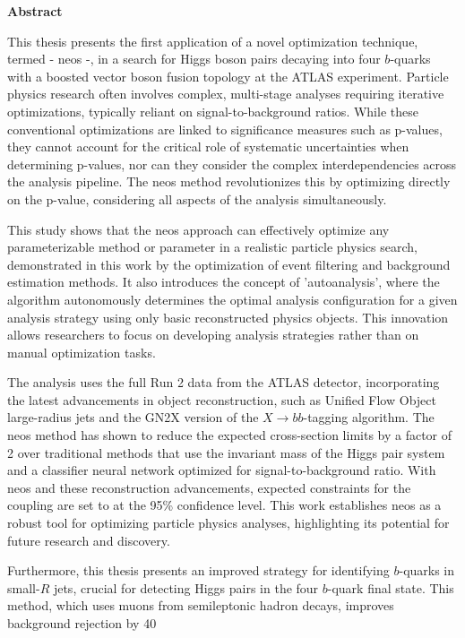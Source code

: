 \begin{center}
\textbf{Abstract}
\end{center}

\noindent This thesis presents the first application of a novel optimization technique, termed - \acf{neos} -, in a search for Higgs boson pairs decaying into four $b$-quarks with a boosted vector boson fusion topology at the ATLAS experiment. Particle physics research often involves complex, multi-stage analyses requiring iterative optimizations, typically reliant on signal-to-background ratios. While these conventional optimizations are linked to significance measures such as p-values, they cannot account for the critical role of systematic uncertainties when determining p-values, nor can they consider the complex interdependencies across the analysis pipeline. The \ac{neos} method revolutionizes this by optimizing directly on the p-value, considering all aspects of the analysis simultaneously.

This study shows that the \ac{neos} approach can effectively optimize any parameterizable method or parameter in a realistic particle physics search, demonstrated in this work by the optimization of event filtering and background estimation methods. It also introduces the concept of 'autoanalysis', where the algorithm autonomously determines the optimal analysis configuration for a given analysis strategy using only basic reconstructed physics objects. This innovation allows researchers to focus on developing analysis strategies rather than on manual optimization tasks.

The analysis uses the full Run 2 data from the ATLAS detector, incorporating the latest advancements in object reconstruction, such as Unified Flow Object large-radius jets and the GN2X version of the $X\rightarrow bb$-tagging algorithm. The \ac{neos} method has shown to reduce the expected cross-section limits by a factor of 2 over traditional methods that use the invariant mass of the Higgs pair system and a classifier neural network optimized for signal-to-background ratio. With \ac{neos} and these reconstruction advancements, expected constraints for the \ktwov coupling are set to  at the 95\% confidence level. This work establishes \ac{neos} as a robust tool for optimizing particle physics analyses, highlighting its potential for future research and discovery.

Furthermore, this thesis presents an improved strategy for identifying $b$-quarks in small-$R$ jets, crucial for detecting Higgs pairs in the four $b$-quark final state. This method, which uses muons from semileptonic hadron decays, improves background rejection by 40%





